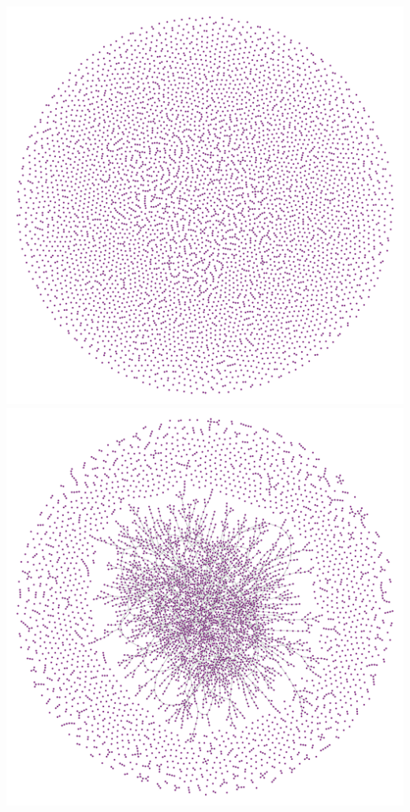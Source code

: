 \documentclass{beamer}
\begin{document}
\begin{frame}
    \frametitle{}
    \centering
    \includegraphics[width=0.55\columnwidth]{er_below_percolation.pdf}
    \includegraphics[width=0.55\columnwidth]{er_large.pdf}
\end{frame}
\end{document}
